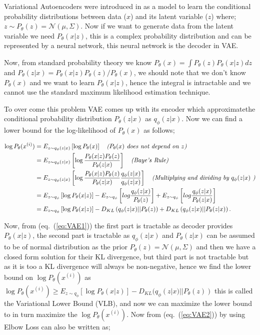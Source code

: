 \documentclass{article}
\begin{document}
	Variational Autoencoders were introduced in \cite{kingmaIntroduction:2019} as a model to learn the conditional probability distributions between data ($x$) and its latent variable ($z$) where;  $z \sim P_{\theta}(z)= \mathcal{N}(\mu,\Sigma)$. Now if we want to generate data from the latent variable we need $P_{\theta}(x|z)$, this is a complex probability distribution and can be represented by a neural network, this neural network is the decoder in VAE.
	
	Now, from standard probability theory we know $P_{\theta}(x)= \int P_{\theta}(z)P_{\theta}(x|z)dz$ and $P_{\theta}(z|x)=P_{\theta}(x|z)P_{\theta}(z)/P_{\theta}(x)$, we should note that we don't know $P_{\theta}(x)$ and we want to learn $P_{\theta}(x|z)$, hence the integral is intractable and we cannot use the standard maximum likelihood estimation technique. 
	
	To over come this problem VAE comes up with its encoder which approximatethe conditional probability distribution $P_{\theta}(z|x)$ as $q_{\phi}(z|x)$. Now we can find a lower bound for the log-likelihood of $P_{\theta}(x)$ as follows;
	
	\begin{align} 
	\log P_{\theta}(x^{(i)}) &= E_{z \sim q_{\phi}(z|x)}  \left[ \log P_{\theta}(x)  \right] \quad \text{\emph{($P_{\theta}(x)$ does not depend on $z$)}} \nonumber \\
	&= E_{z \sim q_{\phi}(z|x)}  \left[ \log \dfrac{P_{\theta}(x|z)P_{\theta}(z)}{P_{\theta}(z|x)}  \right] \quad \text{\emph{(Baye's Rule)}} \nonumber \\
	&= E_{z \sim q_{\phi}(z|x)}  \left[ \log \dfrac{P_{\theta}(x|z)P_{\theta}(z)}{P_{\theta}(z|x)} \dfrac{q_{\phi}(z|x)}{q_{\phi}(z|x)} \right] \quad \text{\emph{(Multiplying and dividing by $q_{\phi}(z|x)$ )}} \nonumber \\
	&= E_{z \sim q_{\phi}}  \left[ \log P_{\theta}(x|z) \right] - E_{z \sim q_{\phi}}  \left[ log \dfrac{q_{\phi}(z|x)}{P_{\theta}(z)}\right] +E_{z \sim q_{\phi}}  \left[ log \dfrac{q_{\phi}(z|x)}{P_{\theta}(z|x)} \right] \label{eq:VAE2} \\
	&= E_{z \sim q_{\phi}}  \left[ \log P_{\theta}(x|z) \right] - D_{KL}\left( q_{\phi}(z|x) || P_{\theta}(z) \right) + D_{KL}\left( q_{\phi}(z|x) || P_{\theta}(z|x) \right). \label{eq:VAE1}
	\end{align} 	
	
	Now, from (eq.~(\ref{eq:VAE1})) the first part is tractable as decoder provides $P_{\theta}(x|z)$, the second part is tractable as $q_{\phi}(z|x) $ and $P_{\theta}(z|x)$ can be assumed to be of normal distribution as the prior $P_{\theta}(z)= \mathcal{N}(\mu,\Sigma)$ and then we have a closed form solution for their KL divergence, but third part is not tractable but as it is too a KL divergence will always be non-negative, hence we find the lower bound on $\log P_{\theta}(x^{(i)})$ as $ \log P_{\theta}(x^{(i)}) \geq E_{z \sim q_{\phi}}  [ \log P_{\theta}(x|z) ] - D_{KL}( q_{\phi}(z|x) || P_{\theta}(z) ) $ this is called the Variational Lower Bound (VLB), and now we can maximize the lower bound to in turn maximize the $\log P_{\theta}(x^{(i)})$. Now from (eq.~(\ref{eq:VAE2})) by using Elbow Loss can also be written as;
	
\end{document}
